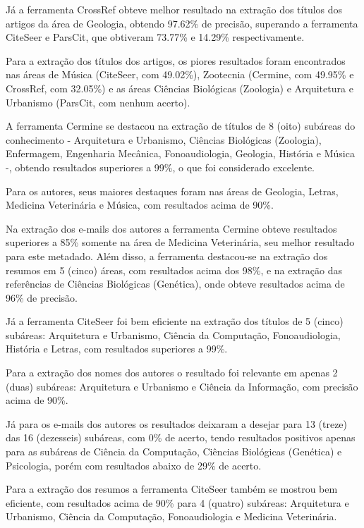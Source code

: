 Já a ferramenta CrossRef obteve melhor resultado na extração dos títulos dos artigos da área de Geologia, obtendo 97.62\% de precisão, superando a ferramenta CiteSeer e ParsCit, que obtiveram 73.77\% e 14.29\% respectivamente.

Para a extração dos títulos dos artigos, os piores resultados foram encontrados nas áreas de Música (CiteSeer, com 49.02\%), Zootecnia (Cermine, com 49.95\% e CrossRef, com 32.05\%) e as áreas Ciências Biológicas (Zoologia) e Arquitetura e Urbanismo (ParsCit, com nenhum acerto).

A ferramenta Cermine se destacou na extração de títulos de 8 (oito) subáreas do conhecimento - Arquitetura e Urbanismo, Ciências Biológicas (Zoologia), Enfermagem, Engenharia Mecânica, Fonoaudiologia, Geologia, História e Música -, obtendo resultados superiores a 99\%, o que foi considerado excelente. 

Para os autores, seus maiores destaques foram nas áreas de Geologia, Letras, Medicina Veterinária e Música, com resultados acima de 90\%. 

Na extração dos e-mails dos autores a ferramenta Cermine obteve resultados superiores a 85\% somente na área de Medicina Veterinária, seu melhor resultado para este metadado. Além disso, a ferramenta destacou-se na extração dos resumos em 5 (cinco) áreas, com resultados acima dos 98\%, e na extração das referências de Ciências Biológicas (Genética), onde obteve resultados acima de 96\% de precisão.

Já a ferramenta CiteSeer foi bem eficiente na extração dos títulos de 5 (cinco) subáreas: Arquitetura e Urbanismo, Ciência da Computação, Fonoaudiologia, História e Letras, com resultados superiores a 99\%. 

Para a extração dos nomes dos autores o resultado foi relevante em apenas 2 (duas) subáreas: Arquitetura e Urbanismo e Ciência da Informação, com precisão acima de 90\%. 

Já para os e-mails dos autores os resultados deixaram a desejar para 13 (treze) das 16 (dezesseis) subáreas, com 0\% de acerto, tendo resultados positivos apenas para as subáreas de Ciência da Computação, Ciências Biológicas (Genética) e Psicologia, porém com resultados abaixo de 29\% de acerto.

Para a extração dos resumos a ferramenta CiteSeer também se mostrou bem eficiente, com resultados acima de 90\% para 4 (quatro) subáreas: Arquitetura e Urbanismo, Ciência da Computação, Fonoaudiologia e Medicina Veterinária. 

